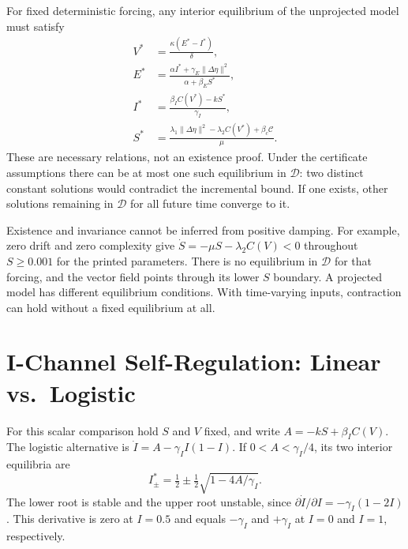 \documentclass[11pt,twocolumn]{article}
\begin{document}
For fixed deterministic forcing, any interior equilibrium of the
unprojected model must satisfy
\begin{align}
 V^*&=\frac{\kappa(E^*-I^*)}{\delta},\label{eq:Vstar}\\
 E^*&=\frac{\alpha I^*+\gamma_E\|\Delta\eta\|^2}
                 {\alpha+\beta_E S^*},\label{eq:Estar}\\
 I^*&=\frac{\beta_I C(V^*)-kS^*}{\gamma_I},\label{eq:Istar}\\
 S^*&=\frac{\lambda_1\|\Delta\eta\|^2-\lambda_2C(V^*)
                     +\beta_c\mathcal C}{\mu}.
\end{align}
These are necessary relations, not an existence proof.
Under the certificate assumptions there can be at most one
such equilibrium in $\mathcal D$: two distinct constant solutions
would contradict the incremental bound. If one exists, other
solutions remaining in $\mathcal D$ for all future time converge to it.

Existence and invariance cannot be inferred from positive damping.
For example, zero drift and zero complexity give
$\dot S=-\mu S-\lambda_2C(V)<0$ throughout $S\ge0.001$ for
the printed parameters. There is no equilibrium in $\mathcal D$
for that forcing, and the vector field points through its lower
$S$ boundary. A projected model has different equilibrium
conditions. With time-varying inputs, contraction can hold without
a fixed equilibrium at all.

\section{I-Channel Self-Regulation: Linear vs.\ Logistic}
\label{app:saturation}

For this scalar comparison hold $S$ and $V$ fixed, and write
$A=-kS+\beta_I C(V)$. The logistic alternative is
$\dot I=A-\gamma_I I(1-I)$. If $0<A<\gamma_I/4$, its two
interior equilibria are
\begin{equation}
 I^*_{\pm}=\tfrac12\pm\tfrac12\sqrt{1-4A/\gamma_I}.
 \label{eq:I-equilibria}
\end{equation}
The lower root is stable and the upper root unstable, since
$\partial\dot I/\partial I=-\gamma_I(1-2I)$. This derivative
is zero at $I=0.5$ and equals $-\gamma_I$ and $+\gamma_I$ at
$I=0$ and $I=1$, respectively.
\end{document}
